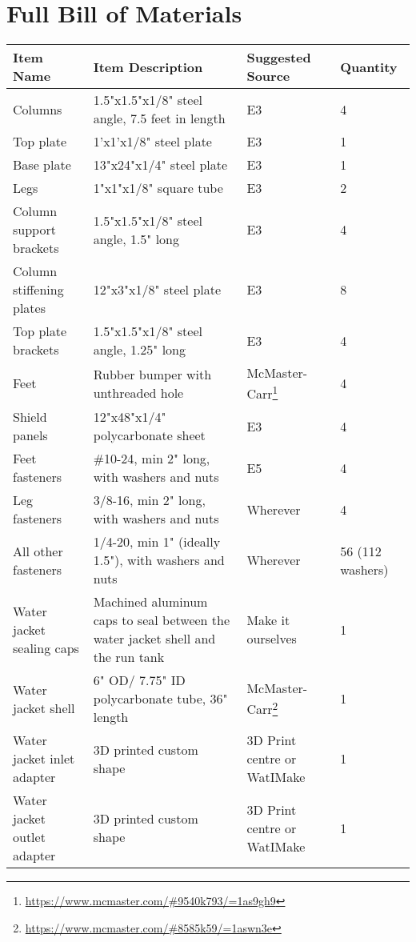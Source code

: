 \documentclass[11pt]{article}
\begin{document}
\section{Full Bill of Materials}
\begin{center}
	\begin{longtabu} to \linewidth { |X[l]|X[2,l]|X[l]|X[0.7,r]| }
		\hline
		\textbf{Item Name} & \textbf{Item Description} & \textbf{Suggested Source} & \textbf{Quantity} \\
		\hline
		Columns & 1.5"x1.5"x1/8" steel angle, 7.5 feet in length & E3 & 4 \\
		\hline
		Top plate & 1'x1'x1/8" steel plate & E3 & 1 \\
		\hline
		Base plate & 13"x24"x1/4" steel plate & E3 & 1 \\
		\hline
		Legs & 1"x1"x1/8" square tube & E3 & 2 \\
		\hline
		Column support brackets & 1.5"x1.5"x1/8" steel angle, 1.5" long & E3 & 4 \\
		\hline
		Column stiffening plates & 12"x3"x1/8" steel plate & E3 & 8 \\
		\hline
		Top plate brackets & 1.5"x1.5"x1/8" steel angle, 1.25" long & E3 & 4 \\
		\hline
		Feet & Rubber bumper with unthreaded hole & McMaster-Carr\footnote{\url{https://www.mcmaster.com/\#9540k793/=1as9gh9}} & 4 \\
		\hline
		Shield panels & 12"x48"x1/4" polycarbonate sheet & E3 & 4\\
		\hline
		Feet fasteners & \#10-24, min 2" long, with washers and nuts	 & E5 & 4 \\
		\hline
		Leg fasteners & 3/8-16, min 2" long, with washers and nuts & Wherever & 4 \\
		\hline
		All other fasteners & 1/4-20, min 1" (ideally 1.5"), with washers and nuts & Wherever & 56 (112 washers) \\
		\hline
		Water jacket sealing caps & Machined aluminum caps to seal between the water jacket shell and the run tank & Make it ourselves & 1 \\
		\hline
		Water jacket shell & 6" OD/ 7.75" ID polycarbonate tube, 36" length & McMaster-Carr\footnote{\url{https://www.mcmaster.com/\#8585k59/=1aswn3e}} & 1 \\
		\hline
		Water jacket inlet adapter & 3D printed custom shape & 3D Print centre or WatIMake & 1 \\
		\hline
		Water jacket outlet adapter & 3D printed custom shape & 3D Print centre or WatIMake & 1 \\

\end{longtabu}
\end{center}
\end{document}
